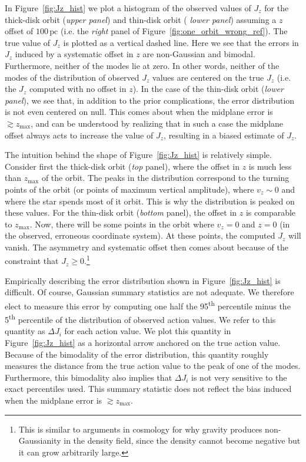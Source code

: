 \documentclass[twocolumn]{aastex62}
\newcommand{\pc}{\text{pc}}
\newcommand{\uth}{\textsuperscript{th}}
\begin{document}
In Figure~\ref{fig:Jz_hist} we plot a histogram of the observed values of
$J_z$ for the thick-disk orbit ({\em upper panel}) and thin-disk orbit ({\em
lower panel}) assuming a $z$ offset of $100\,\pc$ (i.e. the {\em right} panel
of Figure~\ref{fig:one_orbit_wrong_ref}). The true value of $J_z$ is plotted
as a vertical dashed line. Here we see that the errors in $J_z$ induced by a
systematic offset in $z$ are non-Gaussian and bimodal. Furthermore, neither of
the modes lie at zero. In other words, neither of the modes of the
distribution of observed $J_z$ values are centered on the true $J_z$ (i.e. the
$J_z$ computed with no offset in $z$). In the case of the thin-disk orbit
({\em lower panel}), we see that, in addition to the prior complications, the
error distribution is not even centered on null. This comes about when the
midplane error is $\gtrsim z_{\text{max}}$, and can be understood by realizing
that in such a case the midplane offset always acts to increase the value of
$J_z$, resulting in a biased estimate of $J_z$.

The intuition behind the shape of Figure~\ref{fig:Jz_hist} is relatively
simple. Consider first the thick-disk orbit ({\em top} panel), where the
offset in $z$ is much less than $z_{\text{max}}$ of the orbit. The peaks in
the distribution correspond to the turning points of the orbit (or points of
maximum vertical amplitude), where $v_z \sim 0$ and where the star spends
most of it orbit. This is why the distribution is peaked on these values. For
the thin-disk orbit ({\em bottom} panel), the offset in $z$ is comparable to
$z_{\text{max}}$. Now, there will be some points in the orbit where $v_z = 0$
and $z=0$ (in the observed, erroneous coordinate system). At these points, the
computed $J_z$ will vanish. The asymmetry and systematic offset then comes
about because of the constraint that $J_z \geq 0$.\footnote{This is similar to
arguments in cosmology for why gravity produces non-Gaussianity in the density
field, since the density cannot become negative but it can grow arbitrarily
large.}

Empirically describing the error distribution shown in
Figure~\ref{fig:Jz_hist} is difficult. Of course, Gaussian summary statistics
are not adequate. We therefore elect to measure this error by computing one
half the 95\uth{} percentile minus the 5\uth{} percentile of the distribution
of observed action values. We refer to this quantity as $\Delta J_i$ for each
action value. We plot this quantity in Figure~\ref{fig:Jz_hist} as a
horizontal arrow anchored on the true action value. Because of the bimodality
of the error distribution, this quantity roughly measures the distance from
the true action value to the peak of one of the modes. Furthermore, this
bimodality also implies that $\Delta J_i$ is not very sensitive to the exact
percentiles used. This summary statistic does not reflect the bias induced
when the midplane error is $\gtrsim z_{\text{max}}$.
\end{document}
